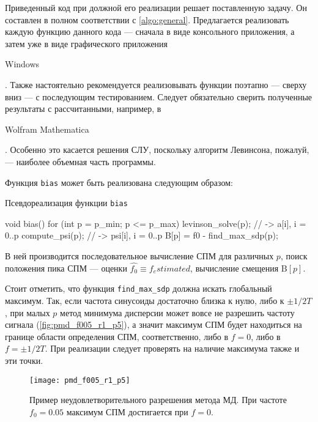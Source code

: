     Приведенный код при должной его реализации решает поставленную задачу. Он составлен в полном соответствии с \autoref{algo:general}. Предлагается реализовать каждую функцию данного кода --- сначала в виде консольного приложения, а затем уже в виде графического приложения \begin{otherlanguage}{english}Windows\end{otherlanguage}. Также настоятельно рекомендуется реализовывать функции поэтапно --- сверху вниз --- с последующим тестированием. Следует обязательно сверить полученные результаты с рассчитанными, например, в \begin{otherlanguage}{english}Wolfram Mathematica\end{otherlanguage}. Особенно это касается решения СЛУ, поскольку алгоритм Левинсона, пожалуй, --- наиболее объемная часть программы.

    Функция \texttt{bias} может быть реализована следующим образом:

    \begin{listing}
        \caption{Псевдореализация функции \texttt{bias}}
        \begin{cppcode}
            void bias()
            {
                for (int p = p_min; p <= p_max)
                {
                    levinson_solve(p); // -> a[i],   i = 0..p
                    compute_psi(p);    // -> psi[i], i = 0..p
                    B[p] = f0 - find_max_sdp(p);
                }
            }
        \end{cppcode}
    \end{listing}

    В ней производится последовательное вычисление СПМ для различных $p$, поиск положения пика СПМ --- оценки $\hat{f_0} \equiv f_estimated$, вычисление смещения $\mathrm{B}\left[p\right]$.

    Стоит отметить, что функция \texttt{find_max_sdp} должна искать глобальный максимум. Так, если частота синусоиды достаточно близка к нулю, либо к $\pm 1 / {2 T}$, при малых $p$ метод минимума дисперсии может вовсе не разрешить частоту сигнала (\autoref{fig:pmd_f005_r1_p5}), а значит максимум СПМ будет находиться на границе области определения СПМ, соответственно, либо в $f = 0$, либо в $f = \pm 1 / {2 T}$. При реализации следует проверять на наличие максимума также и эти точки.

    \begin{figure}
        \centering
        \texttt{[image: pmd\_f005\_r1\_p5]}
        \caption{Пример неудовлетворительного разрешения метода МД. При частоте $f_0=0.05$ максимум СПМ достигается при $f=0$.}
        \label{fig:pmd_f005_r1_p5}
    \end{figure}



